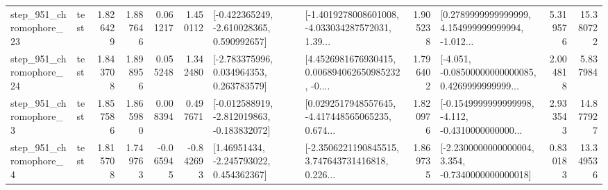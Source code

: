 \begin{tabular}{llrrrrllrlrr}
  step\_951\_chromophore\_23 &      test &      1.826429 &    1.887646 &      0.061217 &  1.450112 &   [-0.422365249, -2.610028365, 0.590992657] &  [-1.4019278008601008, -4.033034287572031, 1.39... &       1.905238 &  [0.2789999999999999, 4.154999999999994, -1.012... &            5.319576 &         15.380722 \\
  step\_951\_chromophore\_24 &      test &      1.843708 &    1.898956 &      0.055248 &  1.342480 &    [-2.783375996, 0.034964353, 0.263783579] &  [4.4526981676930415, 0.006894062650985232, -0.... &       1.796402 &  [-4.051, -0.08500000000000085, 0.4269999999999... &            2.004818 &          5.837984 \\
   step\_951\_chromophore\_3 &      test &      1.857586 &    1.865980 &      0.008394 &  0.497671 &  [-0.012588919, -2.812019863, -0.183832072] &  [0.0292517948557645, -4.417448565065235, 0.674... &       1.820976 &  [-0.1549999999999998, -4.112, -0.4310000000000... &            2.933543 &         14.877927 \\
   step\_951\_chromophore\_4 &      test &      1.815708 &    1.749763 &     -0.065945 & -0.842693 &     [1.46951434, -2.245793022, 0.454362367] &  [-2.3506221190845515, 3.747643731416818, 0.226... &       1.869735 &  [-2.2300000000000004, 3.354, -0.7340000000000018] &            0.830183 &         13.349536 \\
\bottomrule
\end{tabular}

